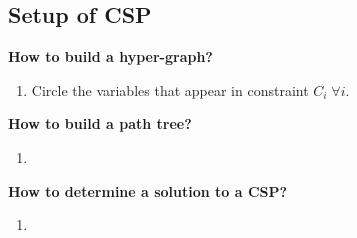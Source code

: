 \subsection{Setup of CSP}

\begin{example}
\end{example}
\newpage

\begin{process} \textbf{How to build a hyper-graph?}
    \begin{enumerate}
        \item Circle the variables that appear in constraint $C_i \; \forall i$.
    \end{enumerate}
\end{process}

\begin{example}
\end{example}

\begin{process} \textbf{How to build a path tree?}
    \begin{enumerate}
        \item 
    \end{enumerate}
\end{process}

\begin{example}
\end{example}

\begin{process} \textbf{How to determine a solution to a CSP?}
    \begin{enumerate}
        \item 
    \end{enumerate}
\end{process}

\begin{example}
\end{example}
\newpage

